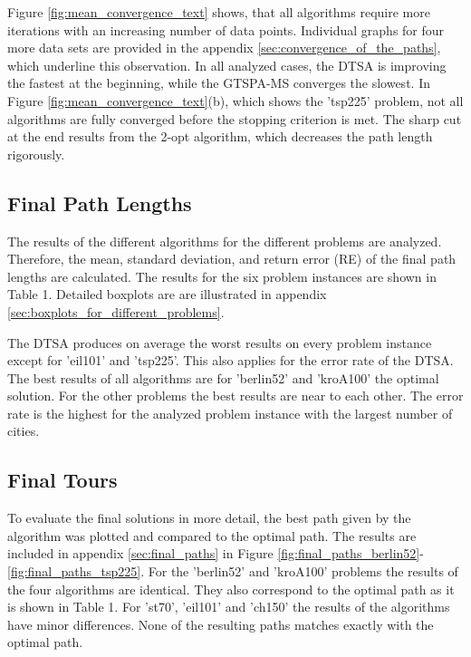 \documentclass[12pt]{article}
\theoremstyle{plain}
\theoremstyle{definition}
\theoremstyle{remark}
\begin{document}

Figure \ref{fig:mean_convergence_text} shows, that all algorithms require more iterations with an increasing number of data points.
Individual graphs for four more data sets are provided in the appendix \ref{sec:convergence_of_the_paths}, which underline this observation.
In all analyzed cases, the DTSA is improving the fastest at the beginning, while the GTSPA-MS converges the slowest.
In Figure \ref{fig:mean_convergence_text}(b), which shows the 'tsp225' problem, not all algorithms are fully converged before the stopping criterion is met.
The sharp cut at the end results from the 2-opt algorithm, which decreases the path length rigorously.

\subsection{Final Path Lengths}
\label{sec:final_path_lengths}

The results of the different algorithms for the different problems are analyzed.
Therefore, the mean, standard deviation, and return error (RE) of the final path lengths are calculated.
The results for the six problem instances are shown in Table 1.
Detailed boxplots are are illustrated in appendix \ref{sec:boxplots_for_different_problems}.



The DTSA produces on average the worst results on every problem instance except for 'eil101' and 'tsp225'.
This also applies for the error rate of the DTSA.
The best results of all algorithms are for 'berlin52' and 'kroA100' the optimal solution.
For the other problems the best results are near to each other.
The error rate is the highest for the analyzed problem instance with the largest number of cities.

\subsection{Final Tours}

To evaluate the final solutions in more detail, the best path given by the algorithm was plotted and compared to the optimal path.
The results are included in appendix \ref{sec:final_paths} in Figure \ref{fig:final_paths_berlin52}-\ref{fig:final_paths_tsp225}.
For the 'berlin52' and 'kroA100' problems the results of the four algorithms are identical.
They also correspond to the optimal path as it is shown in Table 1.
For 'st70', 'eil101' and 'ch150' the results of the algorithms have minor differences.
None of the resulting paths matches exactly with the optimal path.
\end{document}
